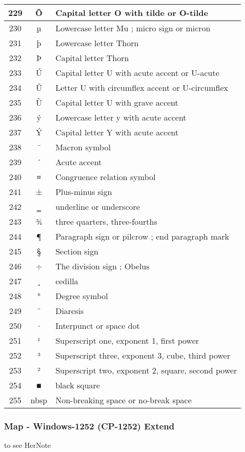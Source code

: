 {\begin{center}
\begin{longtable}{|c|c|l|}
229 & Õ & Capital letter O with tilde or O-tilde \\\hline
230 & µ & Lowercase letter Mu ; micro sign or micron \\\hline
231 & þ & Lowercase letter Thorn \\\hline
232 & Þ & Capital letter Thorn \\\hline
233 & Ú & Capital letter U with acute accent or U-acute \\\hline
234 & Û & Letter U with circumflex accent or U-circumflex \\\hline
235 & Ù & Capital letter U with grave accent \\\hline
236 & ý & Lowercase letter y with acute accent \\\hline
237 & Ý & Capital letter Y with acute accent \\\hline
238 & ¯ & Macron symbol \\\hline
239 & ´ & Acute accent \\\hline
240 & ≡ & Congruence relation symbol \\\hline
241 & ± & Plus-minus sign \\\hline
242 & ‗ & underline or underscore \\\hline
243 & ¾ & three quarters, three-fourths \\\hline
244 & ¶ & Paragraph sign or pilcrow ; end paragraph mark \\\hline
245 & § & Section sign \\\hline
246 & ÷ & The division sign ; Obelus \\\hline
247 & ¸ & cedilla \\\hline
248 & ° & Degree symbol \\\hline
249 & ¨ & Diaresis \\\hline
250 & · & Interpunct or space dot \\\hline
251 & ¹ & Superscript one, exponent 1, first power \\\hline
252 & ³ & Superscript three, exponent 3, cube, third power \\\hline
253 & ² & Superscript two, exponent 2, square, second power \\\hline
254 & ■ & black square \\\hline
255 & nbsp & Non-breaking space or no-break space \\\hline
\end{longtable}\end{center}
}

\subsubsection{Map - Windows-1252 (CP-1252) Extend}

to see HerNote
